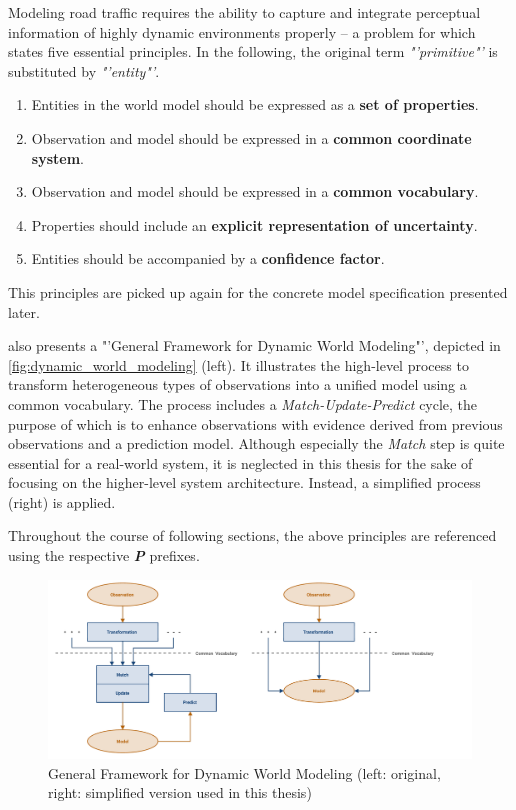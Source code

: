 \begin{samepage}
	Modeling road traffic requires the ability to capture and integrate perceptual information of highly dynamic environments properly – a problem for which \cite{Crowley1993} states five essential principles. In the following, the original term \textit{"'primitive"'} is substituted by \textit{"'entity"'}. 
	
	\begin{enumerate}[\ \ P1:]
		\item Entities in the world model should be expressed as a \textbf{set of properties}.
		\item Observation and model should be expressed in a \textbf{common coordinate system}.
		\item Observation and model should be expressed in a \textbf{common vocabulary}.
		\item Properties should include an \textbf{explicit representation of uncertainty}.
		\item Entities should be accompanied by a \textbf{confidence factor}.
	\end{enumerate}
\end{samepage}

This principles are picked up again for the concrete model specification presented later.

\cite{Crowley1993} also presents a "'General Framework for Dynamic World Modeling"', depicted in \autoref{fig:dynamic_world_modeling} (left). It illustrates the high-level process to transform heterogeneous types of observations into a unified model using a common vocabulary. The process includes a \textit{Match-Update-Predict} cycle, the purpose of which is to enhance observations with evidence derived from previous observations and a prediction model. Although especially the \textit{Match} step is quite essential for a real-world system, it is neglected in this thesis for the sake of focusing on the higher-level system architecture. Instead, a simplified process (right) is applied.

Throughout the course of following sections, the above principles are referenced using the respective \textit{\textbf{P}} prefixes.

\begin{figure}
	\centering
	\includegraphics[width=1.0\linewidth]{98_images/dynamic_world_modeling}
	\caption[General Framework for Dynamic World Modeling]{General Framework for Dynamic World Modeling \cite{Crowley1993} (left: original, right: simplified version used in this thesis)}
	\label{fig:dynamic_world_modeling}
\end{figure}

